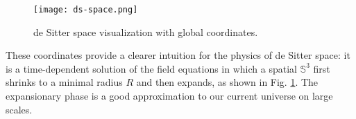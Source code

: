 \begin{figure}
  \centering
  \texttt{[image: ds-space.png]}
  \caption{de Sitter space visualization with global coordinates.}
  \label{ds-space}
\end{figure}

These coordinates provide a clearer intuition for the physics of de Sitter space: it is a time-dependent solution of the field equations in which a spatial $ \mathbb{S}^3 $ first shrinks to a minimal radius $ R $ and then expands, as shown in Fig. \ref{ds-space}. The expansionary phase is a good approximation to our current universe on large scales.










